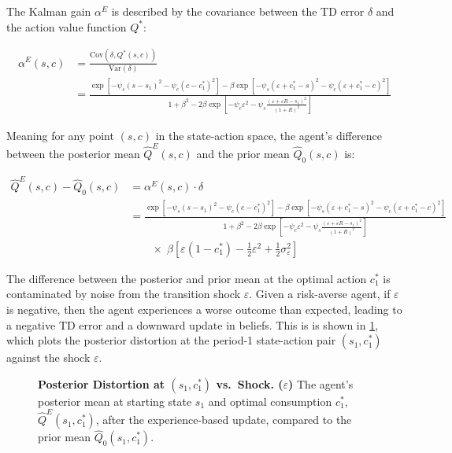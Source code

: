 The Kalman gain $\alpha^E$ is described by the covariance between the TD error $\delta$ 
and the action value function $Q^*$:

\begin{align*}
  \alpha^E(s,c) &= \frac{
    \text{Cov}(\delta, Q^*(s,c))
  }{
    \text{Var}(\delta)
  } \\[8pt]
  &= \frac{
    \exp\left[
      -\psi_s(s - s_1)^2
      - \psi_c(c - c_1^*)^2
    \right]
    - \beta \exp\left[
      -\psi_s(\varepsilon + c_1^* - s)^2
      - \psi_c(\varepsilon + c_1^* - c)^2
    \right]
  }{
    1 + \beta^2
    - 2\beta \exp\left[
      -\psi_c \varepsilon^2
      - \psi_s \frac{
        (\varepsilon + \varepsilon R - s_1)^2
      }{(1+R)^2}
    \right]
  }
\end{align*}

Meaning for any point $(s,c)$ in the state-action space, the agent's difference 
between the posterior mean $\hat{Q}^E(s,c)$ and the prior mean $\hat{Q}_0(s,c)$ is:

\begin{align*}
  \hat{Q}^E(s,c) - \hat{Q}_0(s,c)
  &= \alpha^E(s,c) \cdot \delta \\[10pt]
  &= \frac{
    \exp\left[
      -\psi_s(s - s_1)^2
      - \psi_c(c - c_1^*)^2
    \right]
    - \beta \exp\left[
      -\psi_s(\varepsilon + c_1^* - s)^2
      - \psi_c(\varepsilon + c_1^* - c)^2
    \right]
  }{
    1 + \beta^2
    - 2\beta \exp\left[
      -\psi_c \varepsilon^2
      - \psi_s \frac{
        (\varepsilon + \varepsilon R - s_1)^2
      }{(1+R)^2}
    \right]
  } \\
  &\qquad \times \;
    \beta \left[\varepsilon (1 - c_1^*) - \tfrac{1}{2}\varepsilon^2 + \tfrac{1}{2}\sigma_\varepsilon^2\right]
\end{align*}

The difference between the posterior and prior mean at the optimal action $c_1^*$ is
contaminated by noise from the transition shock $\varepsilon$. Given a risk-averse agent, 
if $\varepsilon$ is negative, then the agent experiences a worse outcome than expected, leading to a 
negative TD error and a downward update in beliefs. This is is shown in \ref{fig:update_vs_eps},
which plots the posterior distortion at the period-1 state-action pair $(s_1, c_1^*)$ against the shock $\varepsilon$. 

\begin{figure} \label{fig:update_vs_eps}
\centering
\resizebox{\textwidth}{!}{
  
}
\caption[Posterior Distortion]{
  \textbf{Posterior Distortion at $(s_1, c_1^*)$
  vs.\ Shock. ($\varepsilon$)}
The agent's posterior mean at starting state $s_1$ and optimal consumption $c_1^*$, $\hat{Q}^E(s_1,c_1^*)$, after the experience-based update, compared to the prior mean $\hat{Q}_0(s_1,c_1^*)$.}
\end{figure}

